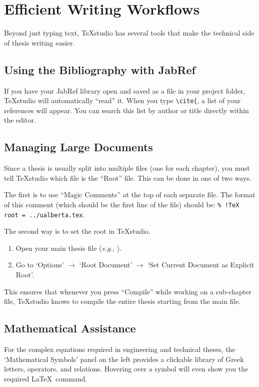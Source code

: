 	\section{Efficient Writing Workflows}
		Beyond just typing text, TeXstudio has several tools that make the technical side of thesis writing easier.
		
		\subsection{Using the Bibliography with JabRef}
			If you have your JabRef library open and saved as a  file in your project folder, TeXstudio will automatically \enquote{read} it. 
			When you type \texttt{\textbackslash cite\{}, a list of your references will appear. 
			You can search this list by author or title directly within the editor.
		
		\subsection{Managing Large Documents}
			Since a thesis is usually split into multiple files (one for each chapter), you must tell TeXstudio which file is the \enquote{Root} file.
			This can be done in one of two ways.

			The first is to use \enquote{Magic Comments} at the top of each separate file.
			The format of this comment (which should be the first line of the file) should be:
			\texttt{\% !TeX root = ../ualberta.tex}.

			The second way is to set the root in TeXstudio.
			\begin{enumerate}
				\item Open your main thesis file (\textit{e.g.}, ).
				\item Go to `Options' $\rightarrow$ `Root Document' $\rightarrow$ `Set Current Document as Explicit Root'.
			\end{enumerate}
			This ensures that whenever you press \enquote{Compile} while working on a sub-chapter file, TeXstudio knows to compile the entire thesis starting from the main file.
		
		\subsection{Mathematical Assistance}
			For the complex equations required in engineering and technical theses, the `Mathematical Symbols' panel on the left provides a clickable library of Greek letters, operators, and relations. 
			Hovering over a symbol will even show you the required \LaTeX\ command.